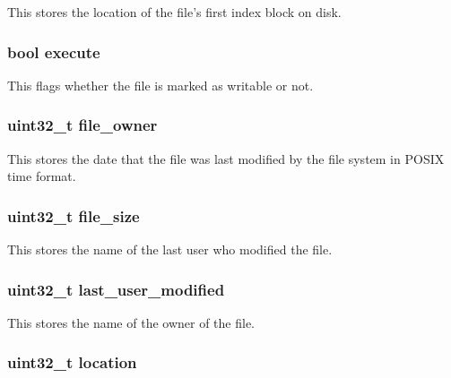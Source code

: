 This stores the location of the file's first index block on disk. \hypertarget{structinode_a253e08d8b620206d485babf8a40d53db}{
\subsubsection[{execute}]{\setlength{\rightskip}{0pt plus 5cm}bool execute}}\label{structinode_a253e08d8b620206d485babf8a40d53db}
This flags whether the file is marked as writable or not. \hypertarget{structinode_a3f405dba01154bed631df46b0a27d593}{
\subsubsection[{file\-\_\-owner}]{\setlength{\rightskip}{0pt plus 5cm}uint32\-\_\-t file\-\_\-owner}}\label{structinode_a3f405dba01154bed631df46b0a27d593}
This stores the date that the file was last modified by the file system in P\-O\-S\-I\-X time format. \hypertarget{structinode_acfc905fb689f590842c0152e3b8cd92e}{
\subsubsection[{file\-\_\-size}]{\setlength{\rightskip}{0pt plus 5cm}uint32\-\_\-t file\-\_\-size}}\label{structinode_acfc905fb689f590842c0152e3b8cd92e}
This stores the name of the last user who modified the file. \hypertarget{structinode_a735957d2fe21c7a191634c86079317d0}{
\subsubsection[{last\-\_\-user\-\_\-modified}]{\setlength{\rightskip}{0pt plus 5cm}uint32\-\_\-t last\-\_\-user\-\_\-modified}}\label{structinode_a735957d2fe21c7a191634c86079317d0}
This stores the name of the owner of the file. \hypertarget{structinode_a8f37ff59738c23420be43a6b1ba69769}{
\subsubsection[{location}]{\setlength{\rightskip}{0pt plus 5cm}uint32\-\_\-t location}}\label{structinode_a8f37ff59738c23420be43a6b1ba69769}
